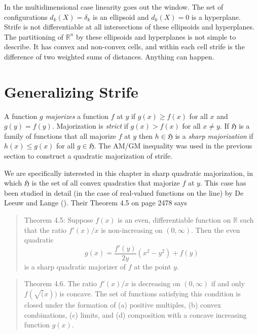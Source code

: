 \documentclass[
  12pt,
  letterpaper,
  DIV=11,
  numbers=noendperiod]{scrartcl}
\newcommand{\sectionbreak}{\pagebreak}
\begin{document}
In the multidimensional case linearity goes out the window. The set of
configurations \(d_k(X)=\delta_k\) is an ellipsoid and \(d_k(X)=0\) is a
hyperplane. Strife is not differentiable at all intersections of these
ellipsoids and hyperplanes. The partitioning of \(\mathbb{R}^n\) by
these ellipsoids and hyperplanes is not simple to describe. It has
convex and non-convex cells, and within each cell strife is the
difference of two weighted sums of distances. Anything can happen.

\sectionbreak

\section{Generalizing Strife}\label{generalizing-strife}

A function \(g\) \emph{majorizes} a function \(f\) at \(y\) if
\(g(x)\geq f(x)\) for all \(x\) and \(g(y)=f(y)\). Majorization is
\emph{strict} if \(g(x)>f(x)\) for all \(x\not= y\). If \(\mathfrak{H}\)
is a family of functions that all majorize \(f\) at \(y\) then
\(h\in\mathfrak{H}\) is a \emph{sharp majorization} if \(h(x)\leq g(x)\)
for all \(g\in\mathfrak{H}\). The AM/GM inequality was used in the
previous section to construct a quadratic majorization of strife.

We are specifically interested in this chapter in sharp quadratic
majorization, in which \(\mathfrak{H}\) is the set of all convex
quadratics that majorize \(f\) at \(y\). This case has been studied in
detail (in the case of real-valued functions on the line) by De Leeuw
and Lange (). Their Theorem 4.5
on page 2478 says

\begin{quote}
Theorem 4.5: Suppose \(f(x)\) is an even, differentiable function on
\(\mathbb{R}\) such that the ratio \(f'(x)/x\) is non-increasing on
\((0,\infty)\). Then the even quadratic \begin{equation}
g(x)=\frac{f'(y)}{2y}(x^2-y^2)+f(y)\label{eq:sharp}
\end{equation} is a sharp quadratic majorizer of \(f\) at the point
\(y\).
\end{quote}

\begin{quote}
Theorem 4.6. The ratio \(f'(x)/x\) is decreasing on \((0,\infty)\) if
and only \(f(\sqrt(x))\) is concave. The set of functions satisfying
this condition is closed under the formation of (a) positive multiples,
(b) convex combinations, (c) limits, and (d) composition with a concave
increasing function \(g(x)\).
\end{quote}
\end{document}
